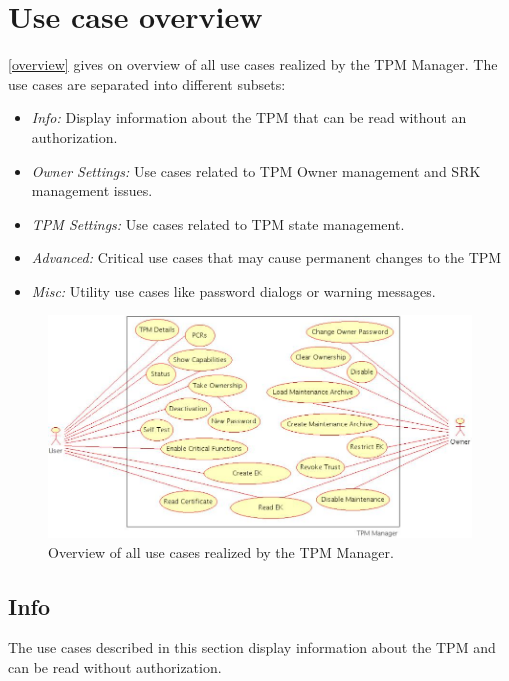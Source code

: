 \documentclass[
  american        %
]{sirrixreport}
\begin{document}
\section{Use case overview} 
\label{sec:overview}
\autoref{overview} gives on overview of all use cases realized by the TPM Manager. The use cases are separated into different subsets:
\begin{itemize}
 \item \emph{Info:} Display information about the TPM that can be read without an authorization.
 \item \emph{Owner Settings:} Use cases related to TPM Owner management and SRK management issues.
 \item \emph{TPM Settings:} Use cases related to TPM state management.
 \item \emph{Advanced:} Critical use cases that may cause permanent changes to the TPM
 \item \emph{Misc:} Utility use cases like password dialogs or warning messages.
\end{itemize}

\begin{figure}[h]
 \centering
 \includegraphics[width=1\textwidth]{images/all_functions.jpg}
 \caption{Overview of all use cases realized by the TPM Manager.}
 \label{overview}
\end{figure}
\clearpage

\subsection{Info}

The use cases described in this section display information about the TPM and can be read without authorization.
\end{document}

